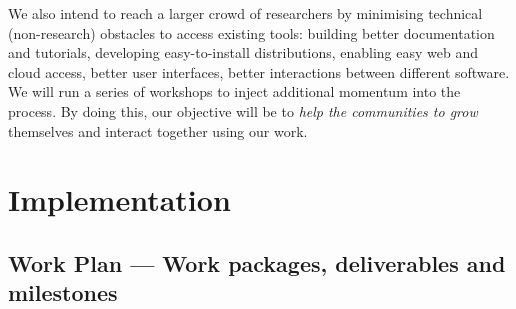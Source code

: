 \documentclass[noworkareas,deliverables,\classoptions]{euproposal}       %
\begin{document}
\begin{proposal}
We also intend to reach a larger crowd of researchers by minimising
technical (non-research) obstacles to access existing tools: building
better documentation and tutorials, developing easy-to-install
distributions, enabling easy web and cloud access, better user
interfaces, better interactions between different software.  We will
run a series of workshops to inject additional momentum into the
process. By doing this, our objective will be to \emph{help the
  communities to grow} themselves and interact together using our
work.


\clearpage

\draftpage


\draftpage


\draftpage


\draftpage


\clearpage


\section{Implementation}

\subsection{Work Plan --- Work packages, deliverables and milestones}
\label{sect:workplan}


\end{proposal}
\end{document}
